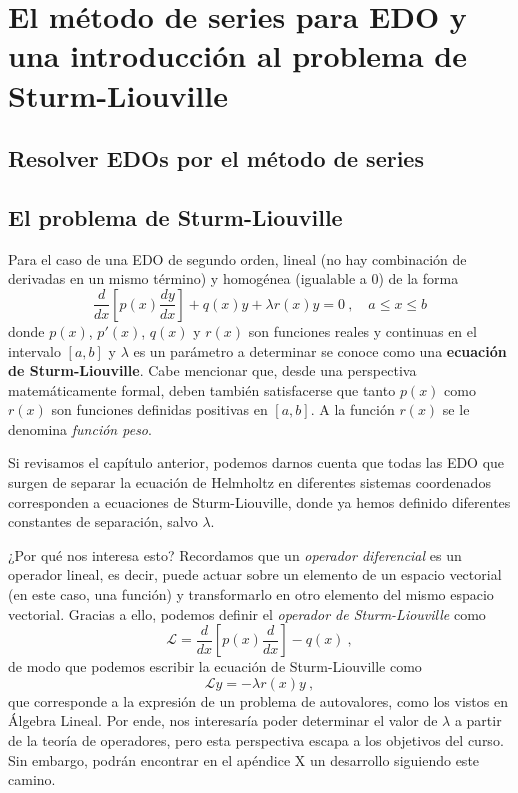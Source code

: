 \chapter{El método de series para EDO y una introducción al problema de Sturm-Liouville}

\section{Resolver EDOs por el método de series}

\section{El problema de Sturm-Liouville}

Para el caso de una EDO de segundo orden, lineal (no hay combinación de derivadas en un mismo término) y homogénea (igualable a 0) de la forma
\begin{equation} \label{eq:Sturm-Liouville}
    \frac{d}{dx}\left[ p(x) \frac{dy}{dx} \right] + q(x) y + \lambda r(x)y = 0 \ , \quad a \leq x \leq b
\end{equation}
donde $p(x)$, $p'(x)$, $q(x)$ y $r(x)$ son funciones reales y continuas en el intervalo $[a,b]$ y $\lambda$ es un parámetro a determinar se conoce como una \textbf{ecuación de Sturm-Liouville}. Cabe mencionar que, desde una perspectiva matemáticamente formal, deben también satisfacerse que tanto $p(x)$ como $r(x)$ son funciones definidas positivas en $[a,b]$. A la función $r(x)$ se le denomina \emph{función peso}.

Si revisamos el capítulo anterior, podemos darnos cuenta que todas las EDO que surgen de separar la ecuación de Helmholtz en diferentes sistemas coordenados corresponden a ecuaciones de Sturm-Liouville, donde ya hemos definido diferentes constantes de separación, salvo $\lambda$.

¿Por qué nos interesa esto? Recordamos que un \emph{operador diferencial} es un operador lineal, es decir, puede actuar sobre un elemento de un espacio vectorial (en este caso, una función) y transformarlo en otro elemento del mismo espacio vectorial. Gracias a ello, podemos definir el \emph{operador de Sturm-Liouville} como
\begin{equation}
    \mathcal{L} = \frac{d}{dx}\left[p(x) \frac{d}{dx}\right] - q(x) \ ,
\end{equation}
de modo que podemos escribir la ecuación de Sturm-Liouville como
\begin{equation}
    \mathcal{L}y = -\lambda r(x) y \ ,
\end{equation}
que corresponde a la expresión de un problema de autovalores, como los vistos en Álgebra Lineal. Por ende, nos interesaría poder determinar el valor de $\lambda$ a partir de la teoría de operadores, pero esta perspectiva escapa a los objetivos del curso. Sin embargo, podrán encontrar en el apéndice X un desarrollo siguiendo este camino.

